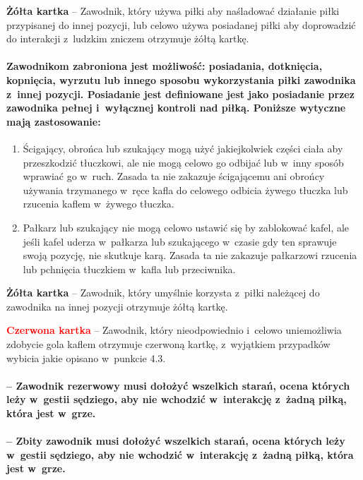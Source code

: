 \documentclass[12pt,a4paper]{article}
\newcommand\redcard[1]{\bgroup\textcolor{red}{\textbf{#1}}}
\newcommand\yellowcard[1]{\bgroup\textcolor{darkyellow}{\textbf{#1}}}
\begin{document}
\yellowcard{Żółta kartka} -- Zawodnik, który używa piłki aby naśladować
działanie piłki przypisanej do innej pozycji, lub celowo używa
posiadanej piłki aby doprowadzić do interakcji z~ludzkim zniczem
otrzymuje żółtą kartkę.

\paragraph{Zawodnikom zabroniona jest możliwość: posiadania,
	dotknięcia, kopnięcia, wyrzutu lub innego sposobu wykorzystania piłki
	zawodnika z~innej pozycji. Posiadanie jest definiowane jest jako
	posiadanie przez zawodnika pełnej i~wyłącznej kontroli nad piłką.
	Poniższe wytyczne mają zastosowanie:}

\begin{enumerate}
	\item Ścigający, obrońca lub szukający mogą użyć jakiejkolwiek części
	      ciała aby przeszkodzić tłuczkowi, ale nie mogą celowo go odbijać lub w~inny sposób wprawiać go w~ruch. Zasada ta nie zakazuje ścigającemu ani
	      obrońcy używania trzymanego w~ręce kafla do celowego odbicia żywego
	      tłuczka lub rzucenia kaflem w~żywego tłuczka.
	\item
	      Pałkarz lub szukający nie mogą celowo ustawić się by zablokować kafel,
	      ale jeśli kafel uderza w~pałkarza lub szukającego w~czasie gdy ten
	      sprawuje swoją pozycję, nie skutkuje karą. Zasada ta nie zakazuje
	      pałkarzowi rzucenia lub pchnięcia tłuczkiem w~kafla lub przeciwnika.
\end{enumerate}

\yellowcard{Żółta kartka} -- Zawodnik, który umyślnie korzysta z~piłki należącej
do zawodnika na innej pozycji otrzymuje żółtą kartkę.

\redcard{Czerwona kartka} -- Zawodnik, który nieodpowiednio i~celowo
uniemożliwia zdobycie gola kaflem otrzymuje czerwoną kartkę, z~wyjątkiem
przypadków wybicia jakie opisano w~punkcie 4.3.

\paragraph{-- Zawodnik rezerwowy musi dołożyć wszelkich starań,
	ocena których leży w~gestii sędziego, aby nie wchodzić w~interakcję z~żadną piłką, która jest w~grze.}

\paragraph{-- Zbity zawodnik musi dołożyć wszelkich starań, ocena
	których leży w~gestii sędziego, aby nie wchodzić w~interakcję z~żadną
	piłką, która jest w~grze.}
\end{document}
